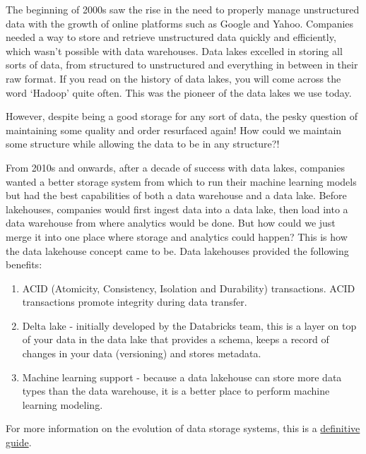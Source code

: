 \documentclass[
]{book}
\begin{document}
The beginning of 2000s saw the rise in the need to properly manage unstructured data with the growth of online platforms such as Google and Yahoo. Companies needed a way to store and retrieve unstructured data quickly and efficiently, which wasn't possible with data warehouses. Data lakes excelled in storing all sorts of data, from structured to unstructured and everything in between in their raw format. If you read on the history of data lakes, you will come across the word `Hadoop' quite often. This was the pioneer of the data lakes we use today.

However, despite being a good storage for any sort of data, the pesky question of maintaining some quality and order resurfaced again! How could we maintain some structure while allowing the data to be in any structure?!

From 2010s and onwards, after a decade of success with data lakes, companies wanted a better storage system from which to run their machine learning models but had the best capabilities of both a data warehouse and a data lake. Before lakehouses, companies would first ingest data into a data lake, then load into a data warehouse from where analytics would be done. But how could we just merge it into one place where storage and analytics could happen? This is how the data lakehouse concept came to be. Data lakehouses provided the following benefits:

\begin{enumerate}
\def\labelenumi{\arabic{enumi}.}
\item
  ACID (Atomicity, Consistency, Isolation and Durability) transactions. ACID transactions promote integrity during data transfer.
\item
  Delta lake - initially developed by the Databricks team, this is a layer on top of your data in the data lake that provides a schema, keeps a record of changes in your data (versioning) and stores metadata.
\item
  Machine learning support - because a data lakehouse can store more data types than the data warehouse, it is a better place to perform machine learning modeling.
\end{enumerate}

For more information on the evolution of data storage systems, this is a \href{https://www.databricks.com/blog/2021/05/19/evolution-to-the-data-lakehouse.html}{definitive guide}.
\end{document}
